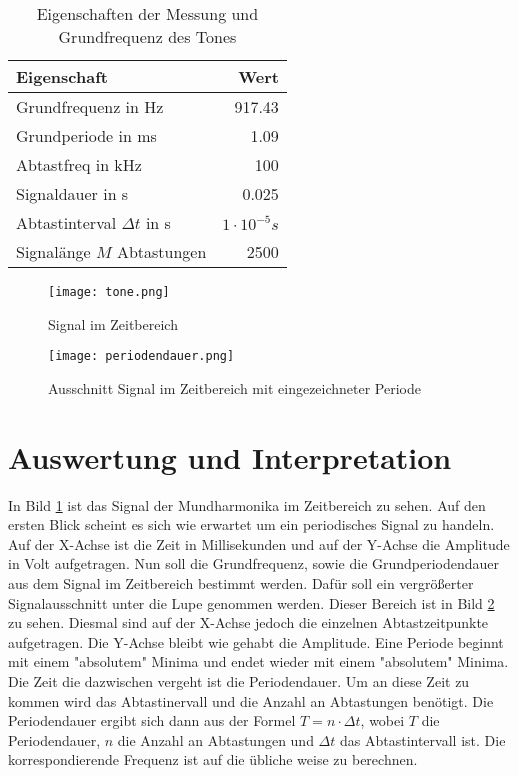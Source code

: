 \begin{table}[H]
\centering
\begin{tabular}{l|r}
Eigenschaft & Wert \\ \hline
Grundfrequenz in Hz & 917.43\\
Grundperiode in ms & 1.09\\
Abtastfreq in kHz & 100\\
Signaldauer in s & 0.025\\
Abtastinterval $\Delta t$ in s & $1 \cdot 10^{-5}s$\\
Signalänge $M$ Abtastungen & 2500\\
\end{tabular}
\caption{Eigenschaften der Messung und Grundfrequenz des Tones}
\label{tab:Eigenschaften}
\end{table}

\begin{figure}[H]
\centering
\texttt{[image: tone.png]}
\caption{Signal im Zeitbereich}
\label{img:SIGNALZEITBEREICH}
\end{figure}

\begin{figure}[H]
\centering
\texttt{[image: periodendauer.png]}
\caption{Ausschnitt Signal im Zeitbereich mit eingezeichneter Periode}
\label{img:SIGNALPERIODE}
\end{figure}

\section{Auswertung und Interpretation}
\label{chap:VERSUCH_1_AUSWERTUNG}
In Bild \ref{img:SIGNALZEITBEREICH} ist das Signal der Mundharmonika im Zeitbereich zu sehen. Auf den ersten Blick scheint es sich wie erwartet um ein periodisches Signal zu handeln. Auf der X-Achse ist die Zeit in Millisekunden und auf der Y-Achse die Amplitude in Volt aufgetragen. Nun soll die Grundfrequenz, sowie die Grundperiodendauer aus dem Signal im Zeitbereich bestimmt werden. Dafür soll ein vergrößerter Signalausschnitt  unter die Lupe genommen werden. Dieser Bereich ist in Bild \ref{img:SIGNALPERIODE} zu sehen. Diesmal sind auf der X-Achse jedoch die einzelnen Abtastzeitpunkte aufgetragen. Die Y-Achse bleibt wie gehabt die Amplitude. Eine Periode beginnt mit einem "absolutem" Minima und endet wieder mit einem "absolutem" Minima. Die Zeit die dazwischen vergeht ist die Periodendauer. Um an diese Zeit zu kommen wird das Abtastinervall und die Anzahl an Abtastungen benötigt. Die Periodendauer ergibt sich dann aus der Formel $T = n \cdot \Delta t$, wobei $T$ die Periodendauer, $n$ die Anzahl an Abtastungen und $\Delta t$ das Abtastintervall ist. Die korrespondierende Frequenz ist auf die übliche weise zu berechnen.
